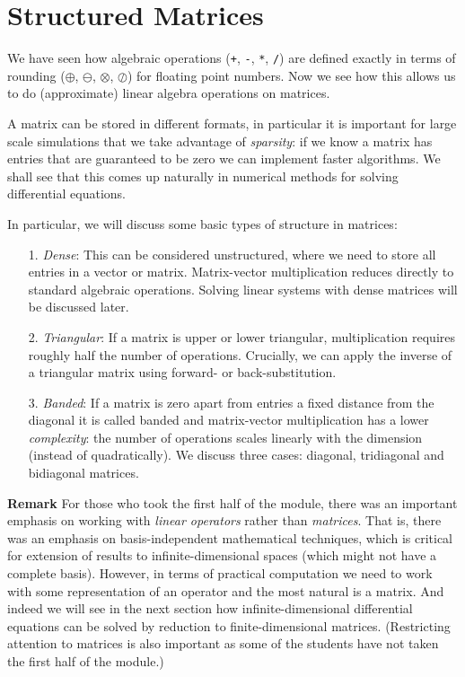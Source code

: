 
\section{Structured Matrices}
We have seen how algebraic operations (\texttt{+}, \texttt{-}, \texttt{*}, \texttt{/}) are defined exactly in terms of rounding ($\ensuremath{\oplus}$, $\ensuremath{\ominus}$, $\ensuremath{\otimes}$, $\ensuremath{\oslash}$) for floating point numbers. Now we see how this allows us to do (approximate) linear algebra operations on matrices.

A matrix can be stored in different formats, in particular it is important for large scale simulations that we take advantage of \emph{sparsity}: if we know a matrix has entries that are guaranteed to be zero we can implement faster algorithms. We shall see that this comes up naturally in numerical methods for solving differential equations.

In particular, we will discuss some basic types of structure in matrices:

\begin{itemize}
\item[1. ] \emph{Dense}: This can be considered unstructured, where we need to store all entries in a vector or matrix. Matrix-vector multiplication reduces directly to standard algebraic operations. Solving linear systems with dense matrices will be discussed later.


\item[2. ] \emph{Triangular}: If a matrix is upper or lower triangular, multiplication requires roughly half the number of operations. Crucially, we can apply the inverse of a triangular matrix using forward- or back-substitution.


\item[3. ] \emph{Banded}: If a matrix is zero apart from entries a fixed distance from  the diagonal it is called banded and matrix-vector multiplication has a lower \emph{complexity}: the number of operations scales linearly with the dimension (instead of quadratically). We discuss three cases: diagonal, tridiagonal and bidiagonal matrices.

\end{itemize}
\textbf{Remark} For those who took the first half of the module, there was an important emphasis on working with \emph{linear operators} rather than \emph{matrices}. That is, there was an emphasis on basis-independent mathematical techniques, which is critical for extension of results to infinite-dimensional spaces (which might not have a complete basis). However, in terms of practical computation we need to work with some representation of an operator and the most natural is a matrix. And indeed we will see in the next section how infinite-dimensional differential equations can be solved by reduction to finite-dimensional matrices. (Restricting attention to matrices is also important as some of the students have not taken the first half of the module.)

